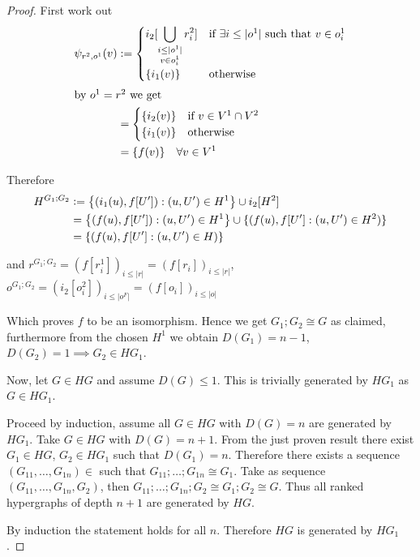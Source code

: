 \documentclass[12pt]{article}
\theoremstyle{definition}
\newcommand{\defeq}{\vcentcolon=}
\newcommand{\1}{\mathbbm{1}}
\begin{document}
\begin{proof}

    First work out
    \begin{align*}
        \psi_{r^2, o^1}(v) &:= 
        \begin{cases}
            i_2[\displaystyle\bigcup_{\substack{i\leq |o^1| \\ v \in o^1_i}} r^2_i]& \text{if } \exists i \leq |o^1| \text{ such that } v \in o^1_i \\
            \{i_1(v)\} & \text{otherwise}
        \end{cases}\\
        \intertext{by $o^1=r^2$ we get}
        &=
        \begin{cases}
            \{i_2(v)\} & \text{if } v\in V^1\cap V^2\\
            \{i_1(v)\} & \text{otherwise}
        \end{cases}\\
        &= \{f(v)\} \quad \forall v\in V^1
    \end{align*}

    Therefore
    \begin{align*}
        H^{G_1;G_2} &\defeq \left\{ \left(i_1(u), f[U']\right) : (u, U') \in H^1 \right\} \cup i_2[H^2]\\
        &= \left\{ \left(f(u), f[U']\right) : (u, U') \in H^1 \right\} \cup \{(f(u), f[U'] : (u,U')\in H^2)\}\\
        &= \{(f(u), f[U'] : (u,U')\in H)\}\\
    \end{align*}

    and $r^{G_1;G_2} = (f[r^1_i])_{i\leq |r|} = (f[r_i])_{i\leq |r|}$, $o^{G_1;G_2} = (i_2[o_i^2])_{i\leq |o^F|} = (f[o_i])_{i\leq |o|}$

    Which proves $f$ to be an isomorphism. Hence we get $G_1;G_2 \cong G$ as claimed, furthermore from the chosen $H^1$ we obtain $D(G_1) = n-1$, $D(G_2) = 1 \implies G_2\in HG_1$.

    Now, let $G\in HG$ and assume $D(G) \leq 1$. This is trivially generated by $HG_1$ as $G\in HG_1$.

    Proceed by induction, assume all $G\in HG$ with $D(G) = n$ are generated by $HG_1$. Take $G\in HG$ with $D(G) = n+1$. From the just proven result there exist $G_1\in HG$, $G_2\in HG_1$ such that $D(G_1) = n$. Therefore there exists a sequence $(G_{11}, \dots, G_{1n}) \in $ such that $G_{11};\dots;G_{1n}\cong G_1$. Take as sequence $(G_{11}, \dots, G_{1n}, G_2)$, then $G_11; \dots; G_{1n}; G_2 \cong G_1; G_2 \cong G$. Thus all ranked hypergraphs of depth $n+1$ are generated by $HG$.

    By induction the statement holds for all $n$. Therefore $HG$ is generated by $HG_1$.
\end{proof}
\end{document}
